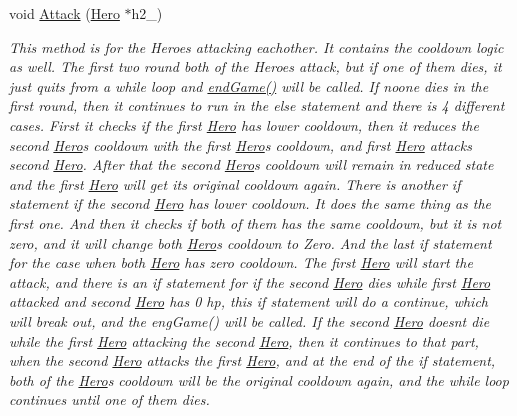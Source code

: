 \begin{DoxyCompactItemize}
void \hyperlink{classHero_a48ca82204d26558b97df7fe795f2ddf9}{Attack} (\hyperlink{classHero}{Hero} $\ast$h2\+\_\+)
\begin{DoxyCompactList}\small\item\em This method is for the Heroes attacking eachother. It contains the cooldown logic as well. The first two round both of the Heroes attack, but if one of them dies, it just quits from a while loop and \hyperlink{classHero_a56e321690e3545aeb4fab9d3181d27e9}{end\+Game()} will be called. If noone dies in the first round, then it continues to run in the else statement and there is 4 different cases. First it checks if the first \hyperlink{classHero}{Hero} has lower cooldown, then it reduces the second \hyperlink{classHero}{Hero}\textquotesingle{}s cooldown with the first \hyperlink{classHero}{Hero}\textquotesingle{}s cooldown, and first \hyperlink{classHero}{Hero} attacks second \hyperlink{classHero}{Hero}. After that the second \hyperlink{classHero}{Hero}\textquotesingle{}s cooldown will remain in reduced state and the first \hyperlink{classHero}{Hero} will get its original cooldown again. There is another if statement if the second \hyperlink{classHero}{Hero} has lower cooldown. It does the same thing as the first one. And then it checks if both of them has the same cooldown, but it is not zero, and it will change both \hyperlink{classHero}{Hero}\textquotesingle{}s cooldown to Zero. And the last if statement for the case when both \hyperlink{classHero}{Hero} has zero cooldown. The first \hyperlink{classHero}{Hero} will start the attack, and there is an if statement for if the second \hyperlink{classHero}{Hero} dies while first \hyperlink{classHero}{Hero} attacked and second \hyperlink{classHero}{Hero} has 0 hp, this if statement will do a continue, which will break out, and the eng\+Game() will be called. If the second \hyperlink{classHero}{Hero} doesn\textquotesingle{}t die while the first \hyperlink{classHero}{Hero} attacking the second \hyperlink{classHero}{Hero}, then it continues to that part, when the second \hyperlink{classHero}{Hero} attacks the first \hyperlink{classHero}{Hero}, and at the end of the if statement, both of the \hyperlink{classHero}{Hero}\textquotesingle{}s cooldown will be the original cooldown again, and the while loop continues until one of them dies. \end{DoxyCompactList}\end{DoxyCompactItemize}
